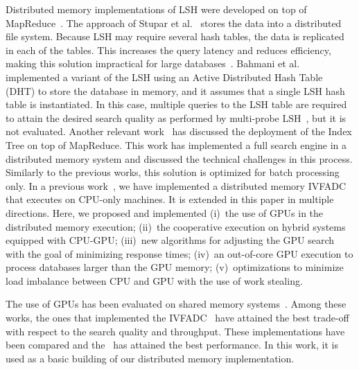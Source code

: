 Distributed memory implementations of LSH were developed on top of MapReduce~\cite{2398596,Stupar10rankreduce}. 
The approach of Stupar 
et al.~\cite{Stupar10rankreduce} stores the data into a distributed file system. Because LSH may require several 
hash tables, the data is replicated in each of the tables. This 
increases the query latency and reduces efficiency, making this solution 
impractical for large databases~\cite{Stupar10rankreduce}. Bahmani et al.~\cite{2398596} implemented a variant of the 
LSH using an Active Distributed Hash Table (DHT) to store the database in memory, and it assumes that a single LSH hash table is 
instantiated. In this case, multiple queries to the LSH table are required to attain the desired search quality as performed by 
multi-probe LSH~\cite{1325958}, but it is not evaluated. Another relevant work~\cite{Moise:2013} 
has discussed the deployment of the Index Tree on top of MapReduce. This work has
implemented a full search engine in a distributed memory system and discussed the technical 
challenges in this process. Similarly to the previous works, this solution is optimized 
for batch processing only. %
In a previous work~\cite{ANDRADE201981}, we have implemented a distributed memory IVFADC 
that executes on CPU-only machines. It is extended in this paper in multiple directions. Here, we proposed and implemented (i)~the use
of GPUs in the distributed memory execution; (ii)~the cooperative
execution on hybrid systems equipped with CPU-GPU; (iii)~new algorithms for adjusting the GPU search
with the goal of minimizing response times; (iv)~an out-of-core GPU execution to process databases
larger than the GPU memory; (v)~optimizations to minimize load 
imbalance between CPU and GPU with the use of work stealing.

The use of GPUs has been evaluated on shared memory systems~\cite{8733051,6267877,Krulis2012,7780592,2093973.2094002}. Among these works, the ones that
implemented the IVFADC~\cite{7780592,8733051} have attained the best trade-off with respect to the search quality and 
throughput. These implementations have been compared and the~\cite{8733051} 
has attained the 
best performance.
In this work, it is used as a basic building of our distributed memory implementation.